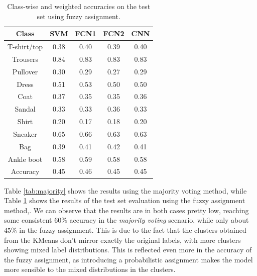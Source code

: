 \documentclass[a4paper, 10pt]{article}
\begin{document}
\begin{table}[ht]
    \centering
    \begin{tabular}{|c|c|c|c|c|}
        \hline
        \textbf{Class} & \textbf{SVM} & \textbf{FCN1} & \textbf{FCN2} & \textbf{CNN} \\
        \hline
        \hline
        T-shirt/top & 0.38 & 0.40 & 0.39 & 0.40 \\
        Trousers    & 0.84 & 0.83 & 0.83 & 0.83 \\
        Pullover    & 0.30 & 0.29 & 0.27 & 0.29 \\
        Dress       & 0.51 & 0.53 & 0.50 & 0.50 \\
        Coat        & 0.37 & 0.35 & 0.35 & 0.36 \\
        Sandal      & 0.33 & 0.33 & 0.36 & 0.33 \\
        Shirt       & 0.20 & 0.17 & 0.18 & 0.20 \\
        Sneaker     & 0.65 & 0.66 & 0.63 & 0.63 \\
        Bag         & 0.39 & 0.41 & 0.42 & 0.41 \\
        Ankle boot  & 0.58 & 0.59 & 0.58 & 0.58 \\
        \hline
        Accuracy    & 0.45 & 0.46 & 0.45 & 0.45 \\
        \hline
    \end{tabular}
    \caption{Class-wise and weighted accuracies on the test set using fuzzy assignment.}
    \label{tab:fuzzy}
\end{table}

Table \ref{tab:majority} shows the results using the majority voting method, while Table \ref{tab:fuzzy} shows the results of the test set evaluation 
using the fuzzy assignment method,. We can observe that the results are in both cases pretty low, reaching some consistent $60\%$ accuracy in the \textit{majority voting} 
scenario, while only about $45\%$ in the fuzzy assignment. This is due to the fact that the clusters obtained from the KMeans don't mirror exactly the original
labels, with more clusters showing mixed label distributions. This is reflected even more in the accuracy of the fuzzy assignment, as introducing a 
probabilistic assignment makes the model more sensible to the mixed distributions in the clusters.
\end{document}
